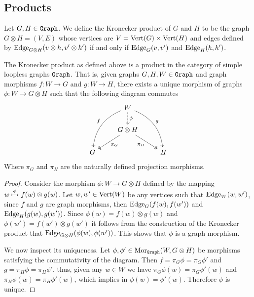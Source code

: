 \subsection{Products}

\begin{definition}
    Let \(G, H \in {\texttt{Graph}}\). We define the Kronecker product of \(G\) and \(H\) to
    be the graph \(G \otimes H = (V, E)\) whose vertices are \(V = \operatorname{Vert}(G) \times
    \operatorname{Vert}(H)\) and edges defined by \(\operatorname{Edge}_{G \otimes H}(v \otimes h, v' \otimes h')\) if
    and only if \(\operatorname{Edge}_G(v, v')\) and \(\operatorname{Edge}_H(h, h')\).
\end{definition}

\begin{proposition}[Products]
    The Kronecker product as defined above is a product in the category of simple
    loopless graphs \({\texttt{Graph}}\). That is, given graphs \(G, H, W \in {\texttt{Graph}}\) and
    graph morphisms \(f: W \to G\) and \(g: W \to H\), there exists a unique
    morphism of graphs \(\phi: W \to G \otimes H\) such that the following diagram
    commutes
    \[
        \begin{tikzcd}
            &W \ar[d, dashed, "\phi"]
            \ar[ddl, bend right, swap, "f"]
            \ar[ddr, bend left, "g"]
            & \\
            &G \otimes H
            \ar[dr, two heads, swap, "\pi_H"]
            \ar[dl, two heads, "\pi_G"]
            & \\
            G & &H
        \end{tikzcd}
    \]
    Where \(\pi_G\) and \(\pi_H\) are the naturally defined projection morphisms.
\end{proposition}

\begin{proof}
    Consider the morphism \(\phi: W \to G \otimes H\) defined by the mapping \(w
    \xmapsto \phi f(w) \otimes g(w)\). Let \(w, w' \in \operatorname{Vert}(W)\) be any vertices such
    that \(\operatorname{Edge}_W(w, w')\), since \(f\) and \(g\) are graph morphisms, then
    \(\operatorname{Edge}_G(f(w), f(w'))\) and \(\operatorname{Edge}_H(g(w), g(w'))\). Since \(\phi(w) = f(w) \otimes
    g(w)\) and \(\phi(w') = f(w') \otimes g(w')\) it follows from the construction
    of the Kronecker product that \(\operatorname{Edge}_{G \otimes H}(\phi(w), \phi(w'))\). This
    shows that \(\phi\) is a graph morphism.

    We now inspect its uniqueness. Let \(\phi, \phi' \in \operatorname{Mor}_{\texttt{Graph}}(W, G \otimes
    H)\) be morphisms satisfying the commutativity of the diagram. Then \(f =
    \pi_G \phi = \pi_G \phi'\) and \(g = \pi_H \phi = \pi_H \phi'\), thus, given
    any \(w \in W\) we have \(\pi_G\phi(w) = \pi_G \phi'(w)\) and \(\pi_H \phi(w)
    = \pi_H\phi'(w)\), which implies in \(\phi(w) = \phi'(w)\). Therefore \(\phi\)
    is unique.
\end{proof}
